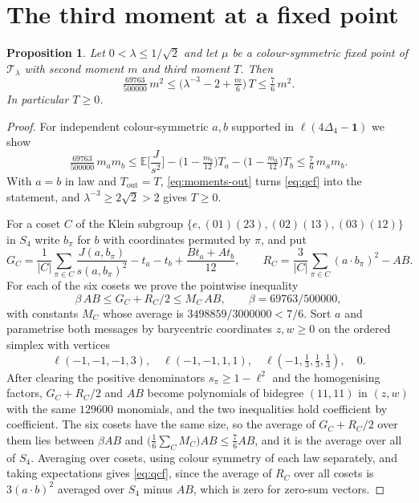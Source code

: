 \documentclass[11pt]{amsart}
\newtheorem{proposition}[theorem]{Proposition}
\theoremstyle{definition}
\theoremstyle{remark}
\newcommand{\E}{\mathbb{E}}
\newcommand{\Simp}{\Delta_4}
\newcommand{\one}{\mathbf{1}}
\begin{document}
\section{The third moment at a fixed point}\label{sec:cubic}

\begin{proposition}\label{prop:cubic}
Let $0<\lambda\le1/\sqrt2$ and let $\mu$ be a colour-symmetric fixed point of $\mathcal T_\lambda$ with
second moment $m$ and third moment $T$. Then
\[
\tfrac{69763}{500000}\,m^2\le\big(\lambda^{-3}-2+\tfrac m6\big)\,T\le\tfrac76\,m^2 .
\]
In particular $T\ge0$.
\end{proposition}

\begin{proof}
For independent colour-symmetric $a,b$ supported in $\ell(4\Simp-\one)$ we show
\begin{equation}\label{eq:qcf}
\tfrac{69763}{500000}\,m_am_b\le\E\Big[\frac J{s^2}\Big]-\big(1-\tfrac{m_b}{12}\big)T_a-\big(1-\tfrac{m_a}{12}\big)T_b
\le\tfrac76\,m_am_b .
\end{equation}
With $a=b$ in law and $T_{\mathrm{out}}=T$, \eqref{eq:moments-out} turns \eqref{eq:qcf} into the
statement, and $\lambda^{-3}\ge2\sqrt2>2$ gives $T\ge0$.

For a coset $C$ of the Klein subgroup $\{e,(01)(23),(02)(13),(03)(12)\}$ in $S_4$ write $b_\pi$ for $b$
with coordinates permuted by $\pi$, and put
\[
G_C=\frac1{|C|}\sum_{\pi\in C}\frac{J(a,b_\pi)}{s(a,b_\pi)^2}-t_a-t_b+\frac{Bt_a+At_b}{12},\qquad
R_C=\frac3{|C|}\sum_{\pi\in C}(a\cdot b_\pi)^2-AB .
\]
For each of the six cosets we prove the pointwise inequality
\[
\beta\,AB\le G_C+R_C/2\le M_C\,AB,\qquad \beta=69763/500000,
\]
with constants $M_C$ whose average is $3498859/3000000<7/6$. Sort $a$ and parametrise both messages
by barycentric coordinates $z,w\ge0$ on the ordered simplex with vertices
\[
\ell(-1,-1,-1,3),\quad \ell(-1,-1,1,1),\quad \ell(-1,\tfrac13,\tfrac13,\tfrac13),\quad 0 .
\]
After clearing the positive
denominators $s_\pi\ge1-\ell^2$ and the homogenising factors, $G_C+R_C/2$ and $AB$ become polynomials of bidegree $(11,11)$ in $(z,w)$
with the same $129600$ monomials, and the two inequalities hold coefficient by coefficient. The six
cosets have the same size, so the average of $G_C+R_C/2$ over them lies between $\beta AB$ and
$\big(\tfrac16\sum_C M_C\big)AB\le\tfrac76AB$, and it is the average over all of $S_4$. Averaging
over cosets, using colour symmetry of each law separately, and taking expectations gives
\eqref{eq:qcf}, since the average of $R_C$ over all cosets is $3(a\cdot b)^2$ averaged over $S_4$ minus
$AB$, which is zero for zero-sum vectors.
\end{proof}
\end{document}
